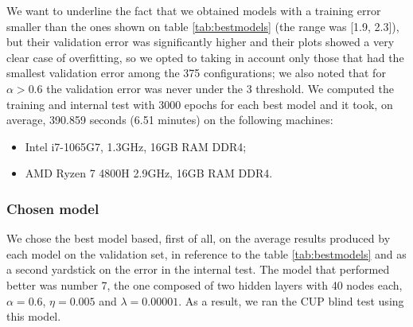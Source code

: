 We want to underline the fact that we obtained models with a training error smaller than the ones shown on table \ref{tab:bestmodels} (the range was [1.9, 2.3]), but their validation error was significantly higher and their plots showed a very clear case of overfitting, so we opted to taking in account only those that had the smallest validation error among the 375 configurations; we also noted that for $\alpha>0.6$ the validation error was never under the 3 threshold.
We computed the training and internal test with 3000 epochs for each best model and it took, on average, 390.859 seconds (6.51 minutes) on the following machines:
\begin{itemize}
    \item Intel i7-1065G7, 1.3GHz, 16GB RAM DDR4;
    \item AMD Ryzen 7 4800H 2.9GHz, 16GB RAM DDR4.
\end{itemize}
\subsubsection{Chosen model}
We chose the best model based, first of all, on the average results produced by each model on the validation set, in reference to the table \ref{tab:bestmodels} and as a second yardstick on the error in the internal test. The model that performed better was number 7, the one composed of two hidden layers with 40 nodes each, $\alpha = 0.6$, $\eta = 0.005$ and $\lambda = 0.00001$. As a result, we ran the CUP blind test using this model.

